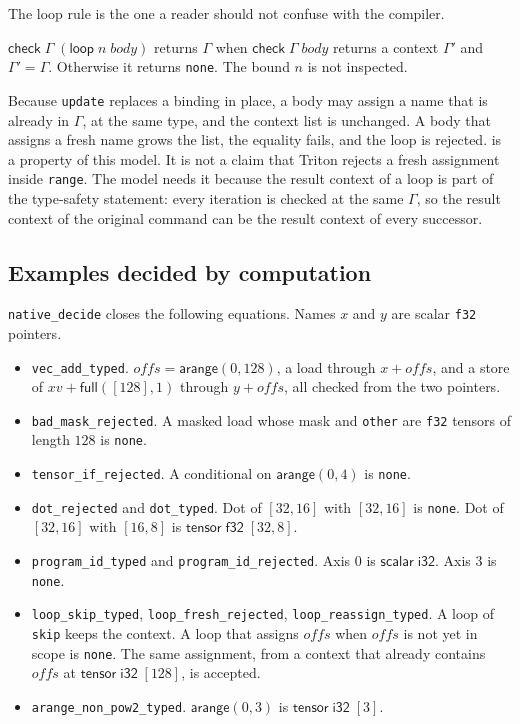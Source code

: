 \documentclass[a4paper,UKenglish,anonymous,cleveref,autoref]{lipics-v2021}
\begin{document}
The loop rule is the one a reader should not confuse with the compiler.
\begin{definition}
\label{def:loop}
\(\mathsf{check}\;\Gamma\;(\mathsf{loop}\;n\;\mathit{body})\) returns \(\Gamma\) when \(\mathsf{check}\;\Gamma\;\mathit{body}\) returns a context \(\Gamma'\) and \(\Gamma' = \Gamma\).
Otherwise it returns \texttt{none}.
The bound \(n\) is not inspected.
\end{definition}
Because \texttt{update} replaces a binding in place, a body may assign a name that is already in \(\Gamma\), at the same type, and the context list is unchanged.
A body that assigns a fresh name grows the list, the equality fails, and the loop is rejected.
 is a property of this model.
It is not a claim that Triton rejects a fresh assignment inside \texttt{range}.
The model needs it because the result context of a loop is part of the type-safety statement: every iteration is checked at the same \(\Gamma\), so the result context of the original command can be the result context of every successor.

\subsection{Examples decided by computation}

\texttt{native\_decide} closes the following equations.
Names \(x\) and \(y\) are scalar \texttt{f32} pointers.
\begin{itemize}
\item \texttt{vec\_add\_typed}.
\(\mathit{offs} = \mathsf{arange}(0,128)\), a load through \(x + \mathit{offs}\), and a store of \(\mathit{xv} + \mathsf{full}([128], 1)\) through \(y + \mathit{offs}\), all checked from the two pointers.
\item \texttt{bad\_mask\_rejected}.
A masked load whose mask and \texttt{other} are \texttt{f32} tensors of length \(128\) is \texttt{none}.
\item \texttt{tensor\_if\_rejected}.
A conditional on \(\mathsf{arange}(0,4)\) is \texttt{none}.
\item \texttt{dot\_rejected} and \texttt{dot\_typed}.
Dot of \([32,16]\) with \([32,16]\) is \texttt{none}.
Dot of \([32,16]\) with \([16,8]\) is \(\mathsf{tensor}\;\mathsf{f32}\;[32,8]\).
\item \texttt{program\_id\_typed} and \texttt{program\_id\_rejected}.
Axis \(0\) is \(\mathsf{scalar}\;\mathsf{i32}\).
Axis \(3\) is \texttt{none}.
\item \texttt{loop\_skip\_typed}, \texttt{loop\_fresh\_rejected}, \texttt{loop\_reassign\_typed}.
A loop of \texttt{skip} keeps the context.
A loop that assigns \(\mathit{offs}\) when \(\mathit{offs}\) is not yet in scope is \texttt{none}.
The same assignment, from a context that already contains \(\mathit{offs}\) at \(\mathsf{tensor}\;\mathsf{i32}\;[128]\), is accepted.
\item \texttt{arange\_non\_pow2\_typed}.
\(\mathsf{arange}(0,3)\) is \(\mathsf{tensor}\;\mathsf{i32}\;[3]\).
\end{itemize}
\end{document}
